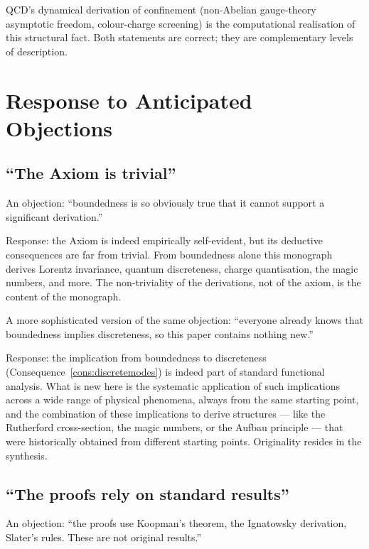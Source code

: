 QCD's dynamical derivation of confinement (non-Abelian gauge-theory
asymptotic freedom, colour-charge screening) is the computational
realisation of this structural fact.  Both statements are correct; they are
complementary levels of description.

\section*{Response to Anticipated Objections}

\subsection*{``The Axiom is trivial''}

An objection: ``boundedness is so obviously true that it cannot support a
significant derivation.''

Response: the Axiom is indeed empirically self-evident, but its deductive
consequences are far from trivial.  From boundedness alone this monograph
derives Lorentz invariance, quantum discreteness, charge quantisation, the
magic numbers, and more.  The non-triviality of the derivations, not of
the axiom, is the content of the monograph.

A more sophisticated version of the same objection: ``everyone already
knows that boundedness implies discreteness, so this paper contains nothing
new.''

Response: the implication from boundedness to discreteness
(Consequence~\ref{cons:discretemodes}) is indeed part of standard functional
analysis.  What is new here is the systematic application of such
implications across a wide range of physical phenomena, always from the
same starting point, and the combination of these implications to derive
structures --- like the Rutherford cross-section, the magic numbers, or the
Aufbau principle --- that were historically obtained from different starting
points.  Originality resides in the synthesis.

\subsection*{``The proofs rely on standard results''}

An objection: ``the proofs use Koopman's theorem, the Ignatowsky
derivation, Slater's rules.  These are not original results.''

